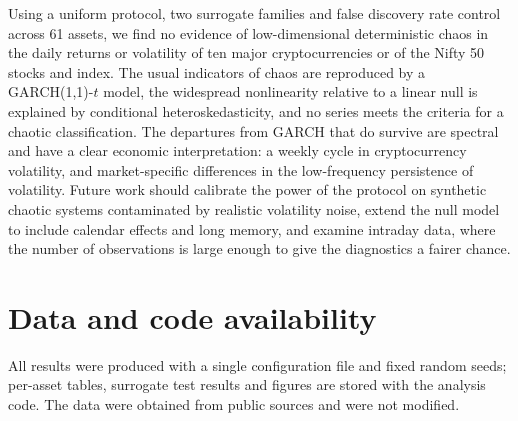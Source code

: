 \documentclass[11pt,a4paper]{article}
\begin{document}
Using a uniform protocol, two surrogate families and false discovery rate control across 61 assets, we find no
evidence of low-dimensional deterministic chaos in the daily returns or volatility of ten major cryptocurrencies or
of the Nifty 50 stocks and index. The usual indicators of chaos are reproduced by a GARCH(1,1)-$t$ model, the
widespread nonlinearity relative to a linear null is explained by conditional heteroskedasticity, and no series meets
the criteria for a chaotic classification. The departures from GARCH that do survive are spectral and have a clear
economic interpretation: a weekly cycle in cryptocurrency volatility, and market-specific differences in the
low-frequency persistence of volatility. Future work should calibrate the power of the protocol on synthetic chaotic
systems contaminated by realistic volatility noise, extend the null model to include calendar effects and long memory,
and examine intraday data, where the number of observations is large enough to give the diagnostics a fairer chance.

\section*{Data and code availability}
All results were produced with a single configuration file and fixed random seeds; per-asset tables, surrogate test
results and figures are stored with the analysis code. The data were obtained from public sources and were not
modified.
\end{document}
